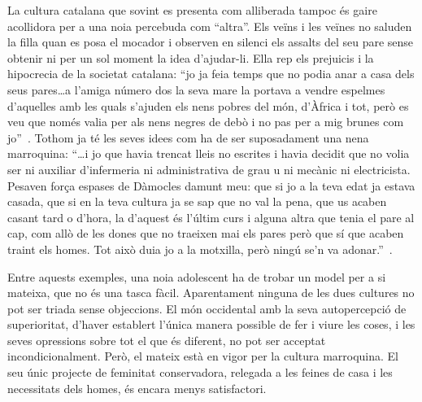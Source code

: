 La cultura catalana que sovint es presenta com alliberada tampoc és gaire acollidora per a una noia percebuda com ``altra''.
Els veïns i les veïnes no saluden la filla quan es posa el mocador i observen en silenci els assalts del seu pare sense obtenir ni per un sol moment la idea d'ajudar-li.
Ella rep els prejuicis i la hipocrecia de la societat catalana:
``jo ja feia temps que no podia anar a casa dels seus pares\ldots a l'amiga número dos la seva mare la portava a vendre espelmes d'aquelles amb les quals s'ajuden els nens pobres del món, d'Àfrica i tot, però es veu que només valia per als nens negres de debò i no pas per a mig brunes com jo''~\autocite[285]{ElHachmi2008}.
Tothom ja té les seves idees com ha de ser suposadament una nena marroquina:
``\ldots i jo que havia trencat lleis no escrites i havia decidit que no volia ser ni auxiliar d'infermeria ni administrativa de grau u ni mecànic ni electricista.
  Pesaven força espases de Dàmocles damunt meu: que si jo a la teva edat ja estava casada, que si en la teva cultura ja se sap que no val la pena, que us acaben casant tard o d'hora, la d'aquest és l'últim curs i alguna altra que tenia el pare al cap, com allò de les dones que no traeixen mai els pares però que sí que acaben traint els homes.
  Tot això duia jo a la motxilla, però ningú se'n va adonar.''~\autocite[273]{ElHachmi2008}.

Entre aquests exemples, una noia adolescent ha de trobar un model per a si mateixa, que no és una tasca fàcil.
Aparentament ninguna de les dues cultures no pot ser triada sense objeccions.
El món occidental amb la seva autopercepció de superioritat, d'haver establert l'única manera possible de fer i viure les coses, i les seves opressions sobre tot el que és diferent, no pot ser acceptat incondicionalment.
Però, el mateix està en vigor per la cultura marroquina.
El seu únic projecte de feminitat conservadora, relegada a les feines de casa i les necessitats dels homes, és encara menys satisfactori.

\begin{comment}
  1) la cultura d'origen representada per
     * el pare
     * la mare
     * la família amb els avis i les tietes
     * els moros de Catalunya
  2) la cultura d'acollida, representada per
     * l'escola
     * les amigues
     * les amants del pare

+ stereotips mútuus de cada grup per l'altre
\end{comment}

